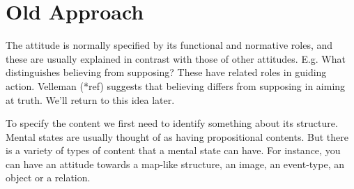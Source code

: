 \documentclass[12pt,\papersize]{extarticle}
\begin{document}
%
%
%
%
%
%
%
%
%
%
%
%
%

\section{Old Approach}
The attitude is normally specified by its functional and normative roles, and these are usually explained in contrast with those of other attitudes.
E.g. What distinguishes believing from supposing?  These have related roles in guiding action.  Velleman (*ref) suggests that believing differs from supposing in aiming at truth.  We'll return to this idea later.

To specify the content we first need to identify something about its structure.
Mental states are usually thought of as having propositional contents.
But there is a variety of types of content that a mental state can have.
For instance, you can have an attitude towards a map-like structure, an image, an event-type, an object or a relation.
\end{document}
